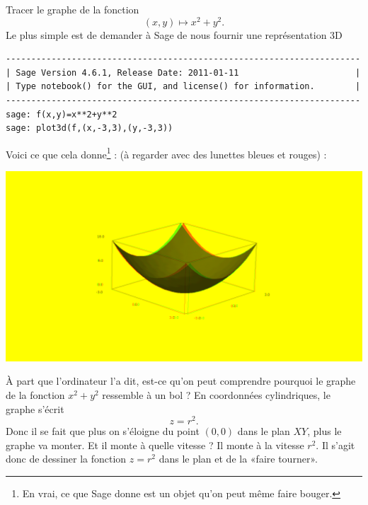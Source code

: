 \begin{example}     \label{ExempleTroisDxxyyOM}

    Tracer le graphe de la fonction 
    \begin{equation}
        (x,y)\mapsto x^2+y^2.
    \end{equation}
    Le plus simple est de demander à Sage de nous fournir une représentation 3D
    \begin{verbatim}
----------------------------------------------------------------------
| Sage Version 4.6.1, Release Date: 2011-01-11                       |
| Type notebook() for the GUI, and license() for information.        |
----------------------------------------------------------------------
sage: f(x,y)=x**2+y**2
sage: plot3d(f,(x,-3,3),(y,-3,3))
    \end{verbatim}
    
    Voici ce que cela donne\footnote{En vrai, ce que Sage donne est un objet qu'on peut même faire bouger.} : (à regarder avec des lunettes bleues et rouges) :
    \begin{center}
            \includegraphics[width=15cm]{pictures_bitmap/coupe.png}
    \end{center}
    À part que l'ordinateur l'a dit, est-ce qu'on peut comprendre pourquoi le graphe de la fonction $x^2+y^2$ ressemble à un bol ? En coordonnées cylindriques, le graphe s'écrit
    \begin{equation}
        z=r^2.
    \end{equation}
    Donc il se fait que plus on s'éloigne du point $(0,0)$ dans le plan $XY$, plus le graphe va monter. Et il monte à quelle vitesse ? Il monte à la vitesse $r^2$. Il s'agit donc de dessiner la fonction $z=r^2$ dans le plan et de la «faire tourner».

\end{example}

